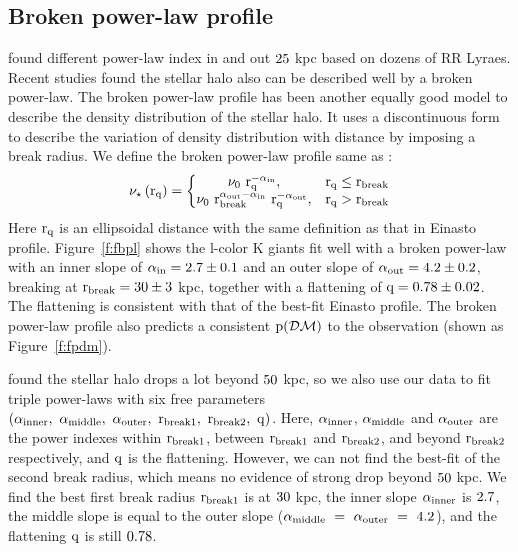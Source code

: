 \documentclass[12pt,preprint]{aastex}
\newcommand{\DM}{\mathcal{DM}}
\begin{document}
\subsection{Broken power-law profile}
\citet{Saha1985} found different power-law index in and out $\rm 25~$kpc based on dozens of RR Lyraes. Recent studies\citep{Sesar2011,Deason2011,Deason2014} found the stellar halo also can be described well by a broken power-law. The broken power-law profile has been another equally good model to describe the density distribution of the stellar halo. It uses a discontinuous form to describe the variation of density distribution with distance by imposing a break radius. We define the broken power-law profile same as \citet{Deason2011}:
\begin{equation}
\rm \nu_\star\left(r_q \right )= \left\{\begin{matrix} \rm \nu_0~r_q^{-\alpha_{in}}, & \rm r_q\leq r_{break} \\ \rm \nu_0~r_{break}^{\alpha_{out}-\alpha_{in}}~r_q^{-\alpha_{out}},&\rm r_q>r_{break} \end{matrix}\right.
\end{equation}
Here $\rm r_q$ is an ellipsoidal distance with the same definition as that in Einasto profile. Figure~\ref{f:fbpl} shows the l-color K giants fit well with a broken power-law with an inner slope of $\rm \alpha_{in}=2.7\pm0.1$ and an outer slope of $\rm \alpha_{out}=4.2\pm0.2$, breaking at $\rm r_{break}=30\pm3~$kpc, together with a flattening of $\rm q=0.78\pm0.02$. The flattening is consistent with that of the best-fit Einasto profile. The broken power-law profile also predicts a consistent $\rm p(\DM)$ to the observation (shown as Figure~\ref{f:fpdm}).

\citet{Deason2014} found the stellar halo drops a lot beyond $\rm 50~$kpc, so we also use our data to fit triple power-laws with six free parameters $\rm \left(\alpha_{inner},~\alpha_{middle},~\alpha_{outer},~r_{break1},~r_{break2},~q\right)$. Here, $\rm \alpha_{inner}$, $\rm \alpha_{middle}$ and $\rm \alpha_{outer}$ are the power indexes within $\rm r_{break1}$, between $\rm r_{break1}$ and $\rm r_{break2}$, and beyond $\rm r_{break2}$ respectively, and $\rm q$ is the flattening. However, we can not find the best-fit of the second break radius, which means no evidence of strong drop beyond $\rm 50~$kpc. We find the best first break radius $\rm r_{break1}$ is at $\rm 30~$kpc, the inner slope $\rm \alpha_{inner}$ is $\rm 2.7$, the middle slope is equal to the outer slope ($\rm \alpha_{middle}~=~ \alpha_{outer}~=~4.2$), and the flattening $\rm q$ is still $\rm 0.78$.
    
\end{document}
